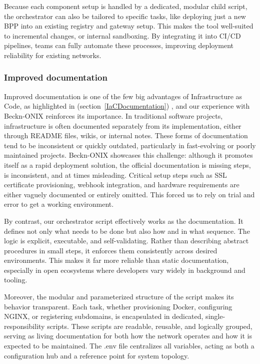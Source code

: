 Because each component setup is handled by a dedicated, modular child script, the orchestrator can also be tailored to specific tasks, like deploying just a new BPP into an existing registry and gateway setup. This makes the tool well-suited to incremental changes, or internal sandboxing. By integrating it into CI/CD pipelines, teams can fully automate these processes, improving deployment reliability for existing networks.

\subsubsection{Improved documentation}
Improved documentation is one of the few big advantages of Infrastructure as Code, as highlighted in (section~\ref{IaCDocumentation}) , and our experience with Beckn-ONIX reinforces its importance. In traditional software projects, infrastructure is often documented separately from its implementation, either through README files, wikis, or internal notes. These forms of documentation tend to be inconsistent or quickly outdated, particularly in fast-evolving or poorly maintained projects. Beckn-ONIX showcases this challenge: although it promotes itself as a rapid deployment solution, the official documentation is missing steps, is inconsistent, and at times misleading. Critical setup steps such as SSL certificate provisioning, webhook integration, and hardware requirements are either vaguely documented or entirely omitted. This forced us to rely on trial and error to get a working environment.

By contrast, our orchestrator script effectively works as the documentation. It defines not only what needs to be done but also how and in what sequence. The logic is explicit, executable, and self-validating. Rather than describing abstract procedures in small steps, it enforces them consistently across desired environments. This makes it far more reliable than static documentation, especially in open ecosystems where developers vary widely in background and tooling.

Moreover, the modular and parameterized structure of the script makes its behavior transparent. Each task, whether provisioning Docker, configuring NGINX, or registering subdomains, is encapsulated in dedicated, single-responsibility scripts. These scripts are readable, reusable, and logically grouped, serving as living documentation for both how the network operates and how it is expected to be maintained. The .env file centralizes all variables, acting as both a configuration hub and a reference point for system topology.

